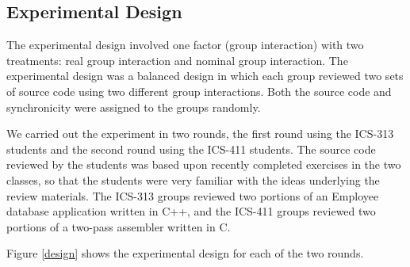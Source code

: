 \subsection{Experimental Design}

The experimental design involved one factor (group interaction) with two
treatments: real group interaction and nominal group
interaction.  The experimental design was a  balanced design in
which each group reviewed two sets of source code using two different group
interactions. Both the source code and synchronicity were assigned to the
groups randomly.  

We carried out the experiment in two rounds, the first round using the
ICS-313 students and the second round using the ICS-411 students. The
source code reviewed by the students was based upon recently completed
exercises in the two classes, so that the students were very familiar with
the ideas underlying the review materials. The ICS-313 groups reviewed two
portions of an Employee database application written in C++, and the
ICS-411 groups reviewed two portions of a two-pass assembler written in C.

Figure \ref{design} shows the experimental design 
for each of the two rounds. 

